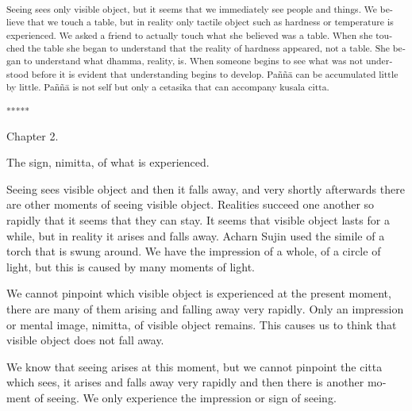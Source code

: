 \textsuperscript{\textdutch{Seeing sees only visible object, but it
seems that we immediately see people and things. We believe that we
touch a table, but in reality only tactile object such as hardness or
temperature is experienced. We asked a friend to actually touch what she
believed was a table. When she touched the table she began to understand
that the reality of hardness appeared, not a table. She began to
understand what dhamma, reality, is. When someone begins to see what was
not understood before it is evident that understanding begins to
develop. Paññā can be accumulated little by little. Paññā is not self
but only a cetasika that can accompany kusala citta. }}

\textsuperscript{\textdutch{*****}}

\textsuperscript{}

\textdutch{Chapter 2.}

\textdutch{The sign, nimitta, of what is experienced.}

\textdutch{Seeing sees visible object and then it falls away, and very
shortly afterwards there are other moments of seeing visible object.
Realities succeed one another so rapidly that it seems that they can
stay. }\textenglish[variant=american]{It seems that visible object lasts
for a while, but in reality it arises and}\textdutch{
}\textenglish[variant=american]{falls away. Acharn Sujin used the simile
of a torch that is swung around. We}\textdutch{
}\textenglish[variant=american]{have the impression of a whole, of a
circle of light, but this is caused by}\textdutch{
}\textenglish[variant=american]{many moments of light.}\textdutch{ }

\textenglish[variant=american]{We cannot pinpoint which visible object
is experienced at}\textdutch{ }\textenglish[variant=american]{the
present moment}\textdutch{, there are many of them arising and falling
away very rapidly}. \textdutch{O}\textenglish[variant=american]{nly an
impression or mental image, nimitta, of}\textdutch{ }\textfrench{visible
object}\textdutch{ remains}\textenglish[variant=american]{. This
}\textdutch{causes}\textenglish[variant=american]{ us to think that
visible object does not}\textdutch{ }\textenglish[variant=american]{fall
away.}\textdutch{ }

\textenglish[variant=american]{We know that seeing arises at this
moment, but we cannot pinpoint the }\textdutch{
}\textitalian{citta}\textdutch{ }\textenglish[variant=american]{which
sees, it arises and falls away very rapidly and then there is
another}\textdutch{ }\textenglish[variant=american]{moment of seeing. We
only experience the impression or sign of seeing.}\textdutch{ }

